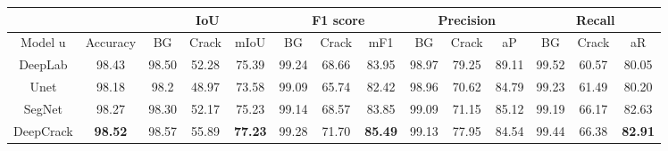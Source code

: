 \documentclass[a4paper,12pt]{report}
\begin{document}
\begin{table}[htbp]
    \begin{adjustbox}{width=\columnwidth,center}
        \begin{tabular}{|c|c|c|c|c|c|c|c|c|c|c|c|c|c|}
            \hline
                                                              &                & \multicolumn{3}{|c|}{\textbf{IoU}} & \multicolumn{3}{|c|}{\textbf{F1 score}} & \multicolumn{3}{|c|}{\textbf{Precision}} & \multicolumn{3}{|c|}{\textbf{Recall}}                                                                                                      \\
            \hline
            {Model}                               u           & {Accuracy}     & {BG}                               & {Crack}                                 & {mIoU}                                   & {BG}                                  & {Crack} & {mF1}          & {BG}    & {Crack} & {aP}           & {BG}    & {Crack} & {aR}           \\
            \hline
            {DeepLab \cite{chen_encoder-decoder_2018}}        & {98.43}        & {98.50}                            & {52.28}                                 & {75.39}                                  & {99.24}                               & {68.66} & {83.95}        & {98.97} & {79.25} & {89.11}        & {99.52} & {60.57} & {80.05}        \\
            \hline
            {Unet \cite{}}                                    & {98.18}        & {98.2}                             & {48.97}                                 & {73.58}                                  & {99.09}                               & {65.74} & {82.42}        & {98.96} & {70.62} & {84.79}        & {99.23} & {61.49} & {80.20}        \\
            \hline
            {SegNet\cite{chen_pavement_2020}}                 & {98.27}        & {98.30}                            & {52.17}                                 & {75.23}                                  & {99.14}                               & {68.57} & {83.85}        & {99.09} & {71.15} & {85.12}        & {99.19} & {66.17} & {82.63}        \\
            \hline
            {DeepCrack\cite{liu_deepcrack_2019}}              & \textbf{98.52} & {98.57}                            & {55.89}                                 & \textbf{77.23}                           & {99.28}                               & {71.70} & \textbf{85.49} & {99.13} & {77.95} & {84.54}        & {99.44} & {66.38} & \textbf{82.91} \\

\end{tabular}
\end{adjustbox}
\end{table}
\end{document}
